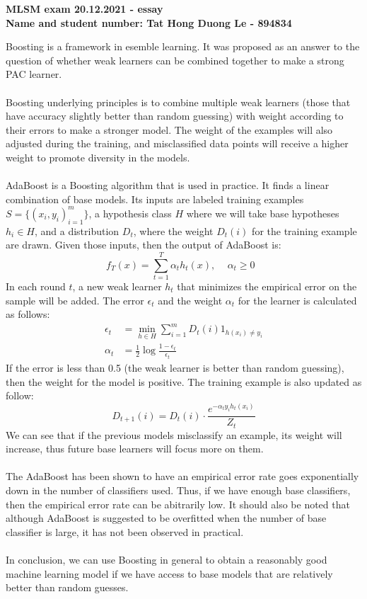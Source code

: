 \documentclass[12pt,a4paper]{article}
\begin{document}
\textbf{MLSM exam 20.12.2021 - essay \\ Name and student number: Tat Hong Duong Le - 894834 }



Boosting is a framework in esemble learning. It was proposed as an answer to the question of whether weak learners can be combined together to make a strong PAC learner. \\\\
Boosting underlying principles is to combine multiple weak learners (those that have accuracy slightly better than random guessing) with weight according to their errors to make a stronger model. The weight of the examples will also adjusted during the training, and misclassified data points will receive a higher weight to promote diversity in the models. \\\\
AdaBoost is a Boosting algorithm that is used in practice. It finds a linear combination of base models. Its inputs are labeled training examples $S = \{(x_i, y_i)^{m}_{i=1}\}$, a hypothesis class $H$ where we will take base hypotheses $h_i \in H$, and a distribution $D_t$, where the weight $D_t(i)$ for the training example are drawn. Given those inputs, then the output of AdaBoost is:
\[
f_T(x) = \sum_{t=1}^{T}{\alpha _t h_t(x)} \text{, $\quad  \alpha _t \geq 0$ }
\]
In each round $t$, a new weak learner $h_t$ that minimizes the empirical error on the sample will be added. The error $\epsilon _t$ and the weight $\alpha _t$ for the learner is calculated as follows:
\[
\begin{aligned}
\epsilon _t &= \min_{h \in H} \sum_{i=1}^{m}D_t(i)1_{h(x_i) \neq y_i} \\
\alpha_t &= \frac{1}{2}\log{\frac{1-\epsilon _t}{\epsilon _t}}
\end{aligned}
\]
If the error is less than 0.5 (the weak learner is better than random guessing), then the weight for the model is positive. The training example is also updated as follow:
\[
D_{t+1}(i) = D_t(i) \cdot \frac{e^{-\alpha _ty_ih_t(x_i)}}{Z_t} 
\]
We can see that if the previous models misclassify an example, its weight will increase, thus future base learners will focus more on them. \\\\
The AdaBoost has been shown to have an empirical error rate goes exponentially down in the number of classifiers used. Thus, if we have enough base classifiers, then the empirical error rate can be abitrarily low. It should also be noted that although AdaBoost is suggested to be overfitted when the number of base classifier is large, it has not been observed in practical.\\\\
In conclusion, we can use Boosting in general to obtain a reasonably good machine learning model if we have access to base models that are relatively better than random guesses.
\end{document}
